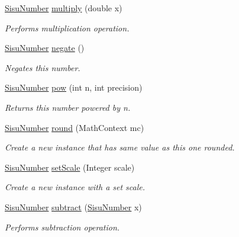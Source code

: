 \begin{DoxyCompactItemize}
\hyperlink{classcom_1_1aarrelaakso_1_1drawl_1_1_sisu_number}{Sisu\+Number} \hyperlink{classcom_1_1aarrelaakso_1_1drawl_1_1_sisu_number_a3255e6ba51f01b287c0acf5121c31d48}{multiply} (double x)
\begin{DoxyCompactList}\small\item\em Performs multiplication operation. \end{DoxyCompactList}\item 
\hyperlink{classcom_1_1aarrelaakso_1_1drawl_1_1_sisu_number}{Sisu\+Number} \hyperlink{classcom_1_1aarrelaakso_1_1drawl_1_1_sisu_number_a2386c00d733c84ee7c97ae11d7d05ea8}{negate} ()
\begin{DoxyCompactList}\small\item\em Negates this number. \end{DoxyCompactList}\item 
\hyperlink{classcom_1_1aarrelaakso_1_1drawl_1_1_sisu_number}{Sisu\+Number} \hyperlink{classcom_1_1aarrelaakso_1_1drawl_1_1_sisu_number_a5946c1e3dcf68a8611e8e7957fe896e0}{pow} (int n, int precision)
\begin{DoxyCompactList}\small\item\em Returns this number powered by n. \end{DoxyCompactList}\item 
\hyperlink{classcom_1_1aarrelaakso_1_1drawl_1_1_sisu_number}{Sisu\+Number} \hyperlink{classcom_1_1aarrelaakso_1_1drawl_1_1_sisu_number_a8e3e3d0dc152b97f0d2c23515e870b52}{round} (Math\+Context mc)
\begin{DoxyCompactList}\small\item\em Create a new instance that has same value as this one rounded. \end{DoxyCompactList}\item 
\hyperlink{classcom_1_1aarrelaakso_1_1drawl_1_1_sisu_number}{Sisu\+Number} \hyperlink{classcom_1_1aarrelaakso_1_1drawl_1_1_sisu_number_ad086a06534f7e4d9f4b61a03f0455c63}{set\+Scale} (Integer scale)
\begin{DoxyCompactList}\small\item\em Create a new instance with a set scale. \end{DoxyCompactList}\item 
\hyperlink{classcom_1_1aarrelaakso_1_1drawl_1_1_sisu_number}{Sisu\+Number} \hyperlink{classcom_1_1aarrelaakso_1_1drawl_1_1_sisu_number_aeb3c7d1a7848eb031fe9a9f961daa0bc}{subtract} (\hyperlink{classcom_1_1aarrelaakso_1_1drawl_1_1_sisu_number}{Sisu\+Number} x)
\begin{DoxyCompactList}\small\item\em Performs subtraction operation. \end{DoxyCompactList}\item 

\end{DoxyCompactItemize}
